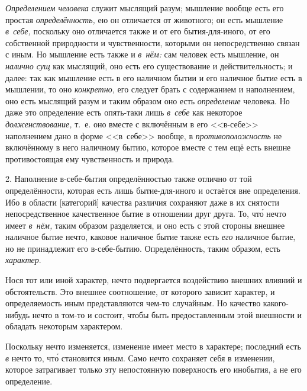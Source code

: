 {\em Определением человека} служит мыслящий разум;
мышление вообще есть его простая {\em определённость,}
ею он отличается от животного; он есть мышление {\em в~себе,}
поскольку оно отличается также и от его бытия-для-иного, от его
собственной природности и чувственности, которыми он непосредственно связан
с иным. Но мышление есть также и {\em в~нём:} сам
человек есть мышление, он {\em налично сущ} как
мыслящий, оно есть его существование и действительность; и далее: так как
мышление есть в его наличном бытии и его наличное бытие есть в мышлении, то
оно {\em конкретно,} его следует брать с содержанием и
наполнением, оно есть мыслящий разум и таким образом оно есть
{\em определение} человека. Но даже это определение
есть опять-таки лишь {\em в~себе} как некоторое
{\em долженствование,} т.~е. оно вместе с включённым
в его <<в-себе>> наполнением дано в форме <<в~себе>>
вообще, в {\em противоположность} не включённому
в него наличному бытию, которое вместе с тем ещё
есть внешне противостоящая ему чувственность и природа.

2. Наполнение в-себе-бытия определённостью также отлично от той
определённости, которая есть лишь бытие-для-иного и остаётся вне
определения. Ибо в области [категорий] качества различия сохраняют даже в
их снятости непосредственное качественное бытие в отношении друг друга. То,
чт\'{о} нечто имеет {\em в~нём,} таким образом разделяется,
и оно есть с этой стороны внешнее наличное бытие нечто, каковое наличное
бытие также есть {\em его} наличное бытие, но не
принадлежит его в-себе-бытию. Определённость, таким образом, есть
{\em характер}.

Нося тот или иной характер, нечто подвергается воздействию внешних влияний
и обстоятельств. Это внешнее соотношение, от которого зависит характер, и
определяемость иным представляются чем-то случайным. Но
качество какого-нибудь нечто в том-то и состоит, чтобы быть предоставленным
этой внешности и обладать некоторым характером.

Поскольку нечто изменяется, изменение имеет место в характере; последний
есть {\em в} нечто то, чт\'{о} становится иным.
Само нечто сохраняет себя в изменении, которое затрагивает только эту
непостоянную поверхность его инобытия, а не его определение.

